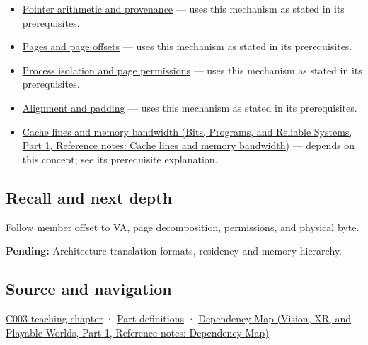 \hypertarget{appendix-18ee4f913c3c-used-by}{}

\begin{itemize}
\item
  \hyperref[appendix-6af5921bc853]{Pointer arithmetic and provenance} --- uses this mechanism as stated in its prerequisites.
\item
  \hyperref[appendix-0c67cd5bf30a]{Pages and page offsets} --- uses this mechanism as stated in its prerequisites.
\item
  \hyperref[appendix-c2a9ad1e2b49]{Process isolation and page permissions} --- uses this mechanism as stated in its prerequisites.
\item
  \hyperref[appendix-a1f7c53b4742]{Alignment and padding} --- uses this mechanism as stated in its prerequisites.
\item
  \href{../01-Bits-Programs-and-Reliable-Systems-P01/main.pdf\#nameddest=appendix-e4ccdbab8320}{Cache lines and memory bandwidth (Bits, Programs, and Reliable Systems, Part 1, Reference notes: Cache lines and memory bandwidth)} --- depends on this concept; see its prerequisite explanation.
\end{itemize}

\subsection{Recall and next depth}\label{appendix-18ee4f913c3c-recall-and-next-depth}

\hypertarget{appendix-18ee4f913c3c-recall-and-next-depth}{}

Follow member offset to VA, page decomposition, permissions, and physical byte.

\textbf{Pending:} Architecture translation formats, residency and memory hierarchy.

\subsection{Source and navigation}\label{appendix-18ee4f913c3c-source-and-navigation}

\hypertarget{appendix-18ee4f913c3c-source-and-navigation}{}

\hyperref[01-foundations-i-ch002-where-the-bytes-live]{C003 teaching chapter} · \hyperref[appendix-fd090d982a15-m003---parts-41-60]{Part definitions} · \href{../07-Vision-XR-and-Playable-Worlds-P01/main.pdf\#nameddest=appendix-4ad47bdd269a}{Dependency Map (Vision, XR, and Playable Worlds, Part 1, Reference notes: Dependency Map)}

